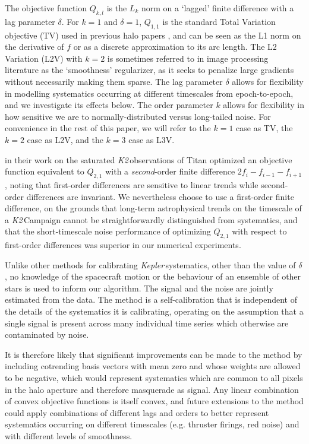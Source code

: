 \documentclass[modern]{aastex62}
\newcommand\kepler{\emph{Kepler}\,}
\newcommand\ktwo{\emph{K2}\,}
\begin{document}
The objective function $Q_{k,l}$ is the $L_k$ norm on a `lagged' finite difference with a lag parameter $\delta$. For $k = 1$ and $\delta = 1$, $Q_{1,1}$ is the standard Total Variation objective (TV) used in previous halo papers \citep[e.g.][]{White2017,Farr2018}, and can be seen as the L1 norm on the derivative of $f$ or as a discrete approximation to its arc length. The L2 Variation (L2V) with $k=2$ is sometimes referred to in image processing literature as the `smoothness' regularizer, as it seeks to penalize large gradients without necessarily making them sparse. The lag parameter $\delta$ allows for flexibility in modelling systematics occurring at different timescales from epoch-to-epoch, and we investigate its effects below. The order parameter $k$ allows for flexibility in how sensitive we are to normally-distributed versus long-tailed noise. For convenience in the rest of this paper, we will refer to the $k=1$ case as TV, the $k=2$ case as L2V, and the $k=3$ case as L3V.

\citet{parker} in their work on the saturated \ktwo observations of Titan optimized an objective function equivalent to $Q_{2,1}$ with a \emph{second}-order finite difference $2f_i -f_{i-1} -f_{i+1}$, noting that first-order differences are sensitive to linear trends while second-order differences are invariant. We nevertheless choose to use a first-order finite difference, on the grounds that long-term astrophysical trends on the timescale of a \ktwo Campaign cannot be straightforwardly distinguished from systematics, and that the short-timescale noise performance of optimizing $Q_{2,1}$ with respect to first-order differences was superior in our numerical experiments. 

Unlike other methods for calibrating \kepler systematics, other than the value of $\delta$, no knowledge of the spacecraft motion or the behaviour of an ensemble of other stars is used to inform our algorithm. The signal and the noise are jointly estimated from the data. The method is a self-calibration that is independent of the details of the systematics it is calibrating, operating on the assumption that a single signal is present across many individual time series which otherwise are contaminated by noise. 

It is therefore likely that significant improvements can be made to the method by including cotrending basis vectors with mean zero and whose weights are allowed to be negative, which would represent systematics which are common to all pixels in the halo aperture and therefore masquerade as signal. Any linear combination of convex objective functions is itself convex, and future extensions to the method could apply combinations of different lags and orders to better represent systematics occurring on different timescales (e.g. thruster firings, red noise) and with different levels of smoothness.
\end{document}
